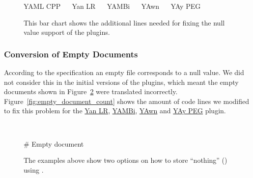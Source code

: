 \begin{figure}[H]
  \begin{bchart}[max=10, width=0.8\textwidth, unit={~Lines of Code}]
  \end{bchart}
  \begin{center}
  \vspace{-0.5cm}
     YAML CPP ~~
     Yan LR ~~
     YAMBi ~~
     YAwn ~~
     YAy PEG
  \vspace{-0.5cm}
  \end{center}
  \caption{This bar chart shows the additional lines needed for fixing the null value support of the  plugins.}
  \label{fig:null_line_count}
\end{figure}

\subsubsection{Conversion of Empty Documents}

According to the  specification an empty file corresponds to a null value. We did not consider this in the initial versions of the  plugins, which meant the empty documents shown in Figure~\ref{fig:null_yaml} were translated incorrectly. Figure~\ref{fig:empty_document_count} shows the amount of code lines we modified to fix this problem for the \href{https://issues.libelektra.org/2711}{Yan LR}, \href{https://issues.libelektra.org/2712}{YAMBi}, \href{https://issues.libelektra.org/2713}{YAwn} and \href{https://issues.libelektra.org/2714}{YAy PEG} plugin.

\begin{figure}[H]
  \centering
  \begin{minipage}[c]{0.48\textwidth}
    \begin{code-boxed}
      \vspace{10pt}
    \end{code-boxed}
  \end{minipage}
  \begin{minipage}[t]{0.02\textwidth}~\end{minipage}
  \begin{minipage}[c]{0.48\textwidth}
    \begin{yamlcode}
      # Empty document
    \end{yamlcode}
  \end{minipage}
  \caption{The examples above show two options on how to store “nothing” () using .}
  \label{fig:null_yaml}
\end{figure}

